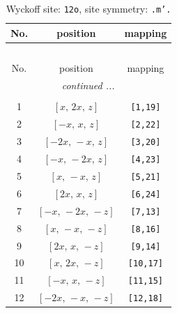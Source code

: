 \documentclass[fleqn,8pt]{jsarticle}
\begin{document}
\begin{longtable}{ccc}
\caption{Wyckoff site: {\tt 12o}, site symmetry: {\tt .m'.}}
 \\
 \hline \hline
No. & position & mapping \\ \hline \endfirsthead

\multicolumn{2}{l}{\tablename\ \thetable{}} \\
 \hline \hline
No. & position & mapping \\ \hline \endhead

 \hline \hline
\multicolumn{2}{r}{\footnotesize\it continued ...} \\ \endfoot

 \hline \hline
\multicolumn{2}{r}{} \\ \endlastfoot

1 & $\left[ x,\, 2 x,\, z \right]$ & {\tt [1,19]} \\ \hline
2 & $\left[ - x,\, x,\, z \right]$ & {\tt [2,22]} \\ \hline
3 & $\left[ - 2 x,\, - x,\, z \right]$ & {\tt [3,20]} \\ \hline
4 & $\left[ - x,\, - 2 x,\, z \right]$ & {\tt [4,23]} \\ \hline
5 & $\left[ x,\, - x,\, z \right]$ & {\tt [5,21]} \\ \hline
6 & $\left[ 2 x,\, x,\, z \right]$ & {\tt [6,24]} \\ \hline
7 & $\left[ - x,\, - 2 x,\, - z \right]$ & {\tt [7,13]} \\ \hline
8 & $\left[ x,\, - x,\, - z \right]$ & {\tt [8,16]} \\ \hline
9 & $\left[ 2 x,\, x,\, - z \right]$ & {\tt [9,14]} \\ \hline
10 & $\left[ x,\, 2 x,\, - z \right]$ & {\tt [10,17]} \\ \hline
11 & $\left[ - x,\, x,\, - z \right]$ & {\tt [11,15]} \\ \hline
12 & $\left[ - 2 x,\, - x,\, - z \right]$ & {\tt [12,18]} \\
\end{longtable}
\renewcommand{\arraystretch}{1.2}
\end{document}
